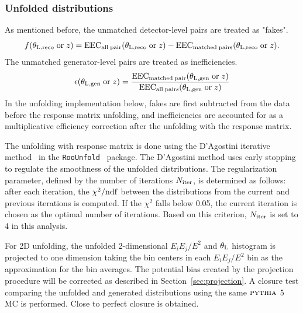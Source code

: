 \documentclass[a4paper,11pt]{article}
\begin{document}
\subsubsection{Unfolded distributions}
\label{sec:unfoldingresults}
As mentioned before, the unmatched detector-level pairs are treated as "fakes". 
\begin{equation}\label{eq:fakefraction}
    f(\theta_{\rm L, reco} \; \text{or} \; z) = \text{EEC}_{\rm all \; pair}(\theta_{\rm L, reco} \; \text{or} \; z) - \text{EEC}_{\rm matched\; pairs}(\theta_{\rm L, reco} \; \text{or} \; z). 
\end{equation}
The unmatched generator-level pairs are treated as inefficiencies.
\begin{equation}\label{eq:matcheff}
    \epsilon(\theta_{\rm L, gen} \; \text{or} \; z) = \frac{\text{EEC}_{\rm matched \; pair}(\theta_{\rm L, gen} \; \text{or} \; z)}{\text{EEC}_{\rm all\; pairs}(\theta_{\rm L, gen} \; \text{or} \; z)}
\end{equation}
In the unfolding implementation below, fakes are first subtracted from the data before the response matrix unfolding, and inefficiencies are accounted for as a multiplicative efficiency correction after the unfolding with the response matrix. 

The unfolding with response matrix is done using the D'Agostini iterative method~\cite{D'Agostini:265717} in the \texttt{RooUnfold}~\cite{Brenner:2019lmf} package. 
The D'Agostini method uses early stopping to regulate the smoothness of the unfolded distributions. 
The regularization parameter, defined by the number of iterations $N_{\rm iter}$, is determined as follows: after each iteration, the $\chi^2/\rm ndf$ between the distributions from the current and previous iterations is computed.
If the $\chi^2$ falls below 0.05, the current iteration is chosen as the optimal number of iterations.
Based on this criterion, $N_{\rm iter}$ is set to 4 in this analysis. 

For 2D unfolding, the unfolded 2-dimensional $E_{i}E_{j}/E^{2}$ and $\theta_{\rm L}$ histogram is projected to one dimension taking the bin centers in each $E_{i}E_{j}/E^{2}$ bin as the approximation for the bin averages. 
The potential bias created by the projection procedure will be corrected as described in Section~\ref{sec:projection}.
A closure test comparing the unfolded and generated distributions using the same $\textsc{pythia}$ 5 MC is performed. 
Close to perfect closure is obtained.
\end{document}
